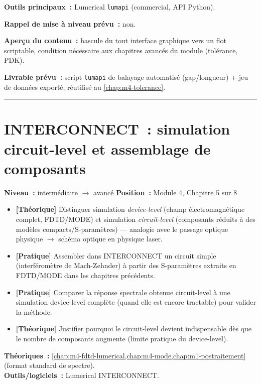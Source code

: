 \noindent\textbf{Outils principaux~:} Lumerical \texttt{lumapi} (commercial, API Python).

\noindent\textbf{Rappel de mise à niveau prévu~:} non.

\noindent\textbf{Aperçu du contenu~:} bascule du \og tout interface graphique\fg{} vers un flot scriptable, condition nécessaire aux chapitres avancés du module (tolérance, PDK).

\noindent\textbf{Livrable prévu~:} script \texttt{lumapi} de balayage automatisé (gap/longueur) + jeu de données exporté, réutilisé au \cref{chap:m4-tolerance}.

\bigskip\hrule\bigskip

\chapter{INTERCONNECT~: simulation circuit-level et assemblage de composants}
\label{chap:m4-interconnect}

\noindent\textbf{Niveau~:} intermédiaire $\to$ avancé \hfill \textbf{Position~:} Module 4, Chapitre 5 sur 8

\begin{objectifs}
\begin{itemize}[leftmargin=1.4em]
  \item \textbf{[Théorique]} Distinguer simulation \emph{device-level} (champ électromagnétique complet, FDTD/MODE) et simulation \emph{circuit-level} (composants réduits à des modèles compacts/S-paramètres) — analogie avec le passage optique physique $\to$ schéma optique en physique laser.
  \item \textbf{[Pratique]} Assembler dans INTERCONNECT un circuit simple (interféromètre de Mach-Zehnder) à partir des S-paramètres extraits en FDTD/MODE dans les chapitres précédents.
  \item \textbf{[Pratique]} Comparer la réponse spectrale obtenue circuit-level à une simulation device-level complète (quand elle est encore tractable) pour valider la méthode.
  \item \textbf{[Théorique]} Justifier pourquoi le circuit-level devient indispensable dès que le nombre de composants augmente (limite pratique du device-level).
\end{itemize}
\end{objectifs}

\begin{prerequis}
\textbf{Théoriques~:} \cref{chap:m4-fdtd-lumerical,chap:m4-mode,chap:m1-postraitement} (format standard de spectre).\\
\textbf{Outils/logiciels~:} Lumerical INTERCONNECT.
\end{prerequis}


